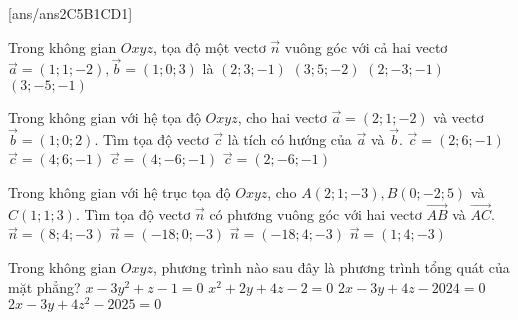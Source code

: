 \TN
{}[ans/ans2C5B1CD1]
\begin{ex}%
	Trong không gian $O x y z$, tọa độ một vectơ $\overrightarrow{n}$ vuông góc với cả hai vectơ $\overrightarrow{a}=(1; 1;-2), \overrightarrow{b}=(1; 0; 3)$ là
	\choice
	{$(2; 3;-1)$}
	{$(3; 5;-2)$}
	{$(2;-3;-1)$}
	{\True $(3;-5;-1)$}
\end{ex}

\begin{ex}%
	Trong không gian với hệ tọa độ $O x y z$, cho hai vectơ $\overrightarrow{a}=(2; 1;-2)$ và vectơ $\overrightarrow{b}=(1; 0; 2)$. Tìm tọa độ vectơ $\overrightarrow{c}$ là tích có hướng của $\overrightarrow{a}$ và $\overrightarrow{b}$.
	\choice
	{$\overrightarrow{c}=(2; 6;-1)$}
	{$\overrightarrow{c}=(4; 6;-1)$}
	{$\overrightarrow{c}=(4;-6;-1)$}
	{\True $\overrightarrow{c}=(2;-6;-1)$}
\end{ex}

\begin{ex}%
	Trong không gian với hệ trục tọa độ $O x y z$, cho $A(2; 1;-3), B(0;-2; 5)$ và $C(1; 1; 3)$. Tìm tọa độ vectơ $\overrightarrow{n}$ có phương vuông góc với hai vectơ $\overrightarrow{A B}$ và $\overrightarrow{A C}$.
	\choice
	{$\overrightarrow{n}=(8; 4;-3)$}
	{$\overrightarrow{n}=(-18; 0;-3)$}
	{\True $\overrightarrow{n}=(-18; 4;-3)$}
	{$\overrightarrow{n}=(1; 4;-3)$}
\end{ex}

\begin{ex}%
	Trong không gian $O x y z$, phương trình nào sau đây là phương trình tổng quát của mặt phẳng?
	\choice
	{$x-3 y^2+z-1=0$}
	{$x^2+2 y+4 z-2=0$}
	{\True $2 x-3 y+4 z-2024=0$}
	{$2 x-3 y+4 z^2-2025=0$}
\end{ex}

